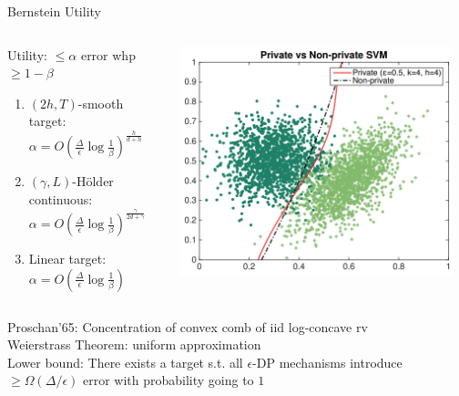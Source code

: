 \documentclass{beamer}
\begin{document}
\begin{frame}{Bernstein Utility}
	\begin{columns}[T,onlytextwidth]
			\begin{alertblock}{Utility: $\leq\alpha$ error whp $\geq 1-\beta$}
			\begin{enumerate}
				\item $(2h,T)$-smooth target: $\alpha=O\left(\frac{\Delta}{\epsilon}\log\frac{1}{\beta}\right)^{\frac{h}{d+h}}$ \\
				\item $(\gamma,L)$-H\"older continuous: $\alpha=O\left(\frac{\Delta}{\epsilon}\log\frac{1}{\beta}\right)^{\frac{\gamma}{2d+\gamma}}$ \\
				\item Linear target: $\alpha=O\left(\frac{\Delta}{\epsilon}\log\frac{1}{\beta}\right)$
			\end{enumerate}
			\end{alertblock}
			\vspace{1em}
			\hfill\includegraphics[width=0.95\textwidth]{figures/results-bernstein-svm}
	\end{columns}

	\pause Proschan'65: Concentration of convex comb of iid log-concave rv \\
	Weierstrass Theorem: uniform approximation \\[0.5em]

	\pause \alert{Lower bound}: There exists a target s.t. all $\epsilon$-DP mechanisms introduce $\geq\Omega(\Delta/\epsilon)$ error with probability going to $1$
\end{frame}
\end{document}
